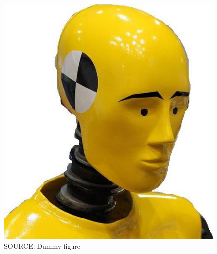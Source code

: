 \documentclass[a4paper, 11pt]{article}
\begin{document}
\begin{figure}
    \includegraphics[scale=1.0]{dummy_web_page.jpg}
    \caption{SOURCE: Dummy figure}
\end{figure}
\end{document}
